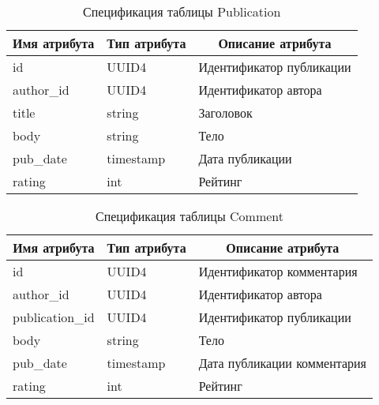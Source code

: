 \begin{table}[H]
	\caption{Спецификация таблицы Publication}
	\begin{tabular}{|l|l|l|}
		\hline
		\multicolumn{1}{|c|}{\textbf{Имя атрибута}} & \multicolumn{1}{c|}{\textbf{Тип атрибута}} & \multicolumn{1}{c|}{\textbf{Описание атрибута}} \\ \hline
		id                                          & UUID4                                      & Идентификатор публикации                        \\ \hline
		author\_id                                  & UUID4                                      & Идентификатор автора                            \\ \hline
		title                                       & string                                     & Заголовок                                       \\ \hline
		body                                        & string                                     & Тело                                            \\ \hline
		pub\_date                                   & timestamp                                  & Дата публикации                                 \\ \hline
		rating                                      & int                                        & Рейтинг                                         \\ \hline
	\end{tabular}
\end{table}

\begin{table}[H]
	\caption{Спецификация таблицы Comment}
	\begin{tabular}{|l|l|l|}
		\hline
		\multicolumn{1}{|c|}{\textbf{Имя атрибута}} & \multicolumn{1}{c|}{\textbf{Тип атрибута}} & \multicolumn{1}{c|}{\textbf{Описание атрибута}} \\ \hline
		id                                          & UUID4                                      & Идентификатор комментария                       \\ \hline
		author\_id                                  & UUID4                                      & Идентификатор автора                            \\ \hline
		publication\_id                             & UUID4                                      & Идентификатор публикации                        \\ \hline
		body                                        & string                                     & Тело                                            \\ \hline
		pub\_date                                   & timestamp                                  & Дата публикации комментария                     \\ \hline
		rating                                      & int                                        & Рейтинг                                         \\ \hline
	\end{tabular}
\end{table}

